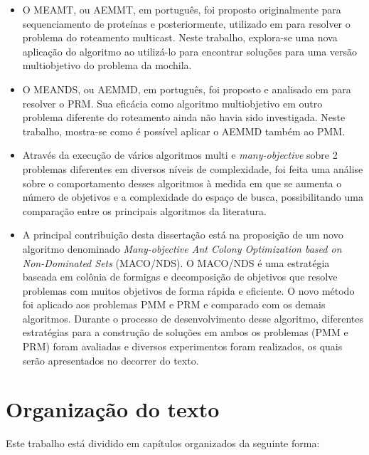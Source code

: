 \begin{itemize}  
	\item O \ac{MEAMT}, ou \ac{AEMMT}, em português, foi proposto originalmente para sequenciamento de proteínas \cite{Brasil2013} e posteriormente, utilizado em  \cite{Lafeta2016} para resolver o problema do roteamento multicast. Neste trabalho, explora-se uma nova aplicação do algoritmo ao utilizá-lo para encontrar soluções para uma versão multiobjetivo do problema da mochila.
	\item O \ac{MEANDS}, ou \ac{AEMMD}, em português, foi proposto e analisado em \cite{Lafeta2016} para resolver o \ac{PRM}. Sua eficácia como algoritmo multiobjetivo em outro problema diferente do roteamento ainda não havia sido investigada. Neste trabalho, mostra-se como é possível aplicar o \ac{AEMMD} também ao \ac{PMM}.
	\item Através da execução de vários algoritmos multi e \textit{many-objective} sobre 2 problemas diferentes em diversos níveis de complexidade, foi feita uma análise sobre o comportamento desses algoritmos à medida em que se aumenta o número de objetivos e a complexidade do espaço de busca, possibilitando uma comparação entre os principais algoritmos da literatura.
	\item A principal contribuição desta dissertação está na proposição de um novo algoritmo denominado \textit{Many-objective Ant Colony Optimization based on Non-Dominated Sets} (MACO/NDS). O MACO/NDS é uma estratégia baseada em colônia de formigas e decomposição de objetivos que resolve problemas com muitos objetivos de forma rápida e eficiente. O novo método foi aplicado aos problemas \ac{PMM} e \ac{PRM} e comparado com os demais algoritmos. Durante o processo de desenvolvimento desse algoritmo, diferentes estratégias para a construção de soluções em ambos os problemas (PMM e PRM) foram avaliadas e diversos experimentos foram realizados, os quais serão apresentados no decorrer do texto.
\end{itemize}

\section{Organização do texto}
Este trabalho está dividido em capítulos organizados da seguinte forma:

